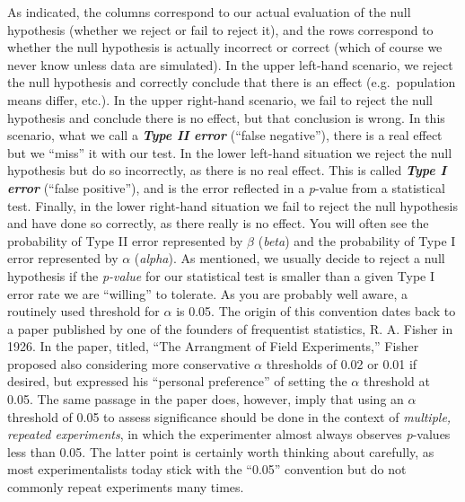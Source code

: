 \documentclass[]{book}
\begin{document}
As indicated, the columns correspond to our actual evaluation of the null hypothesis (whether we reject or fail to reject it), and the rows correspond to whether the null hypothesis is actually incorrect or correct (which of course we never know unless data are simulated). In the upper left-hand scenario, we reject the null hypothesis and correctly conclude that there is an effect (e.g.~population means differ, etc.). In the upper right-hand scenario, we fail to reject the null hypothesis and conclude there is no effect, but that conclusion is wrong. In this scenario, what we call a \textbf{\emph{Type II error}} (``false negative''), there is a real effect but we ``miss'' it with our test. In the lower left-hand situation we reject the null hypothesis but do so incorrectly, as there is no real effect. This is called \textbf{\emph{Type I error}} (``false positive''), and is the error reflected in a \emph{p}-value from a statistical test. Finally, in the lower right-hand situation we fail to reject the null hypothesis and have done so correctly, as there really is no effect. You will often see the probability of Type II error represented by \(\beta\) (\emph{beta}) and the probability of Type I error represented by \(\alpha\) (\emph{alpha}). As mentioned, we usually decide to reject a null hypothesis if the \emph{p-value} for our statistical test is smaller than a given Type I error rate we are ``willing'' to tolerate. As you are probably well aware, a routinely used threshold for \(\alpha\) is 0.05. The origin of this convention dates back to a paper published by one of the founders of frequentist statistics, R. A. Fisher in 1926. In the paper, titled, ``The Arrangment of Field Experiments,'' Fisher proposed also considering more conservative \(\alpha\) thresholds of 0.02 or 0.01 if desired, but expressed his ``personal preference'' of setting the \(\alpha\) threshold at 0.05. The same passage in the paper does, however, imply that using an \(\alpha\) threshold of 0.05 to assess significance should be done in the context of \emph{multiple, repeated experiments}, in which the experimenter almost always observes \emph{p}-values less than 0.05. The latter point is certainly worth thinking about carefully, as most experimentalists today stick with the ``0.05'' convention but do not commonly repeat experiments many times.
\end{document}

